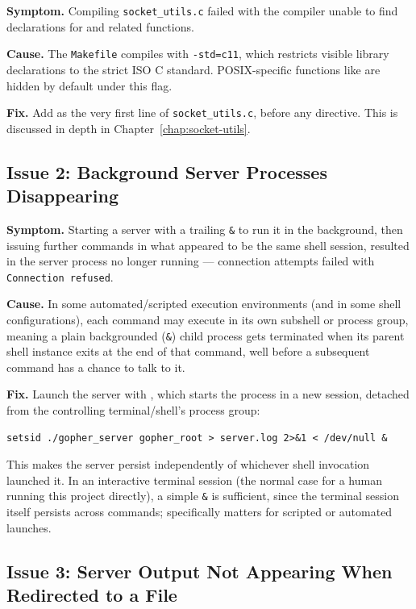 \textbf{Symptom.} Compiling \texttt{socket\_utils.c} failed with the compiler unable to find declarations for  and related functions.

\textbf{Cause.} The \texttt{Makefile} compiles with \texttt{-std=c11}, which restricts visible library declarations to the strict ISO C standard. POSIX-specific functions like  are hidden by default under this flag.

\textbf{Fix.} Add  as the very first line of \texttt{socket\_utils.c}, before any  directive. This is discussed in depth in Chapter~\ref{chap:socket-utils}.

\subsection{Issue 2: Background Server Processes Disappearing}

\textbf{Symptom.} Starting a server with a trailing \texttt{\&} to run it in the background, then issuing further commands in what appeared to be the same shell session, resulted in the server process no longer running --- connection attempts failed with \texttt{Connection refused}.

\textbf{Cause.} In some automated/scripted execution environments (and in some shell configurations), each command may execute in its own subshell or process group, meaning a plain backgrounded (\texttt{\&}) child process gets terminated when its parent shell instance exits at the end of that command, well before a subsequent command has a chance to talk to it.

\textbf{Fix.} Launch the server with , which starts the process in a new session, detached from the controlling terminal/shell's process group:
\begin{lstlisting}[style=bashstyle, numbers=none]
setsid ./gopher_server gopher_root > server.log 2>&1 < /dev/null &
\end{lstlisting}
This makes the server persist independently of whichever shell invocation launched it. In an interactive terminal session (the normal case for a human running this project directly), a simple \texttt{\&} is sufficient, since the terminal session itself persists across commands;  specifically matters for scripted or automated launches.

\subsection{Issue 3: Server Output Not Appearing When Redirected to a File}

